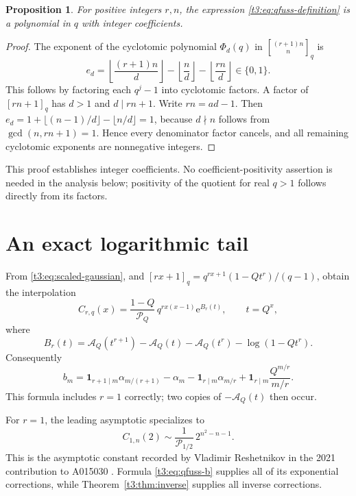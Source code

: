 \documentclass[11pt,openany]{book}
\numberwithin{equation}{chapter}
\theoremstyle{plain}
\newtheorem{proposition}[theorem]{Proposition}
\theoremstyle{definition}
\theoremstyle{remark}
\newcommand{\ee}{\mathrm e}
\newcommand{\qbinq}[2]{\genfrac{[}{]}{0pt}{}{#1}{#2}_{q}}   %
\newcommand{\Pinf}{\mathcal P_Q}
\newcommand{\A}{\mathcal A_Q}
\newcommand{\one}{\mathbf 1}
\begin{document}
\begin{proposition}\label{t3:prop:qfuss-polynomial}
For positive integers $r,n$, the expression \eqref{t3:eq:qfuss-definition} is a polynomial in $q$ with integer coefficients.
\end{proposition}
\begin{proof}
The exponent of the cyclotomic polynomial $\Phi_d(q)$ in
$\qbinq{(r+1)n}{n}$ is
\[
 e_d=\left\lfloor\frac{(r+1)n}{d}\right\rfloor
     -\left\lfloor\frac n d\right\rfloor
     -\left\lfloor\frac{rn}{d}\right\rfloor\in\{0,1\}.
\]
This follows by factoring each $q^j-1$ into cyclotomic factors. A factor of $[rn+1]_q$ has $d>1$ and $d\mid rn+1$. Write $rn=ad-1$. Then
$e_d=1+\lfloor(n-1)/d\rfloor-\lfloor n/d\rfloor=1$, because $d\nmid n$ follows from $\gcd(n,rn+1)=1$. Hence every denominator factor cancels, and all remaining cyclotomic exponents are nonnegative integers.
\end{proof}
This proof establishes integer coefficients. No coefficient-positivity assertion is needed in the analysis below; positivity of the quotient for real $q>1$ follows directly from its factors.

\section{An exact logarithmic tail}

From \eqref{t3:eq:scaled-gaussian}, and
$[rx+1]_q=q^{rx+1}(1-Qt^r)/(q-1)$, obtain the interpolation
\begin{equation}\label{t3:eq:qfuss-interp}
 C_{r,q}(x)=\frac{1-Q}{\Pinf}\,q^{r x(x-1)}\ee^{B_r(t)},
 \qquad t=Q^x,
\end{equation}
where
\begin{equation}\label{t3:eq:qfuss-B}
 B_r(t)=\A(t^{r+1})-\A(t)-\A(t^r)-\log(1-Qt^r).
\end{equation}
Consequently
\begin{equation}\label{t3:eq:qfuss-b}
 b_m=\one_{r+1\mid m}\alpha_{m/(r+1)}-\alpha_m
 -\one_{r\mid m}\alpha_{m/r}
 +\one_{r\mid m}\frac{Q^{m/r}}{m/r}.
\end{equation}
This formula includes $r=1$ correctly; two copies of $-\A(t)$ then occur.

For $r=1$, the leading asymptotic specializes to
\begin{equation}\label{t3:eq:qCatalan-leading}
 C_{1,n}(2)\sim\frac1{\mathcal P_{1/2}}\,2^{n^2-n-1}.
\end{equation}
This is the asymptotic constant recorded by Vladimir Reshetnikov in the 2021 contribution to A015030 \cite{oeisqcatalan}. Formula \eqref{t3:eq:qfuss-b} supplies all of its exponential corrections, while Theorem~\ref{t3:thm:inverse} supplies all inverse corrections.
\end{document}
